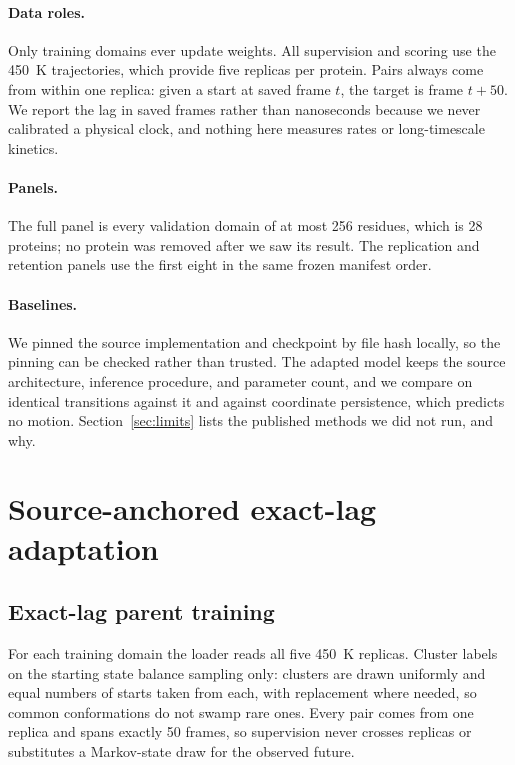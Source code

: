 \documentclass{article}
\begin{document}
\paragraph{Data roles.} Only training domains ever update weights. All supervision and scoring use the 450~K trajectories, which provide five replicas per protein. Pairs always come from within one replica: given a start at saved frame $t$, the target is frame $t+50$. We report the lag in saved frames rather than nanoseconds because we never calibrated a physical clock, and nothing here measures rates or long-timescale kinetics.

\paragraph{Panels.} The full panel is every validation domain of at most 256 residues, which is 28 proteins; no protein was removed after we saw its result. The replication and retention panels use the first eight in the same frozen manifest order.

\paragraph{Baselines.} We pinned the source implementation and checkpoint by file hash locally, so the pinning can be checked rather than trusted. The adapted model keeps the source architecture, inference procedure, and parameter count, and we compare on identical transitions against it and against coordinate persistence, which predicts no motion. Section~\ref{sec:limits} lists the published methods we did not run, and why.

\section{Source-anchored exact-lag adaptation}

\subsection{Exact-lag parent training}

For each training domain the loader reads all five 450~K replicas. Cluster labels on the starting state balance sampling only: clusters are drawn uniformly and equal numbers of starts taken from each, with replacement where needed, so common conformations do not swamp rare ones. Every pair comes from one replica and spans exactly 50 frames, so supervision never crosses replicas or substitutes a Markov-state draw for the observed future.
\end{document}
